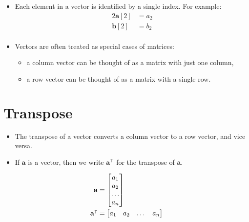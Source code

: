 \documentclass[xcolor={table}]{beamer}
\begin{document}
\begin{frame}
\begin{itemize}
\item Each element in a vector is identified by a single index. For example: 
	\begin{alignat*}{2}
	\mathbf{a}[2]&=a_{2}\\
	\mathbf{b}[2]&=b_{2}\\
	\end{alignat*}
\item Vectors are often treated as special cases of matrices:
	\begin{itemize}
		\item a column vector can be thought of as a matrix with just one column,
		\item a row vector can be thought of as a matrix with a single row.
	\end{itemize}
\end{itemize}
\end{frame}

\section{Transpose}

\begin{frame}
\begin{itemize}
 \item The transpose of a vector converts a column vector to a row vector, and vice versa. 
 \item If $\mathbf{a}$ is a vector, then we write $\mathbf{a}^\intercal$ for the transpose of $\mathbf{a}$. 
 \end{itemize}
 \end{frame}
 
 \begin{frame}
 \begin{example}
	\begin{alignat*}{2}
		\mathbf{a} &= 
		\begin{bmatrix}
			a_1\\
			a_2\\
			\dots\\
			a_n\\
		\end{bmatrix} \notag\\
		\mathbf{a}^\intercal &= 
		\begin{bmatrix}
			a_1 & a_2 & \dots & a_n\\
		\end{bmatrix} \notag\\
	\end{alignat*}
\end{example}
\end{frame}
\end{document}
